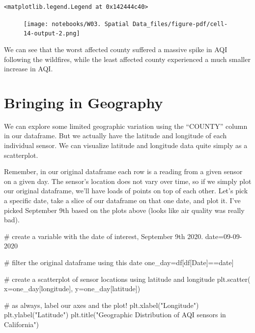 \documentclass[
  letterpaper,
  DIV=11,
  numbers=noendperiod]{scrreprt}
\newenvironment{Shaded}{\begin{snugshade}}{\end{snugshade}}
\newcommand{\CommentTok}[1]{\textcolor[rgb]{0.37,0.37,0.37}{#1}}
\newcommand{\NormalTok}[1]{\textcolor[rgb]{0.00,0.23,0.31}{#1}}
\newcommand{\OperatorTok}[1]{\textcolor[rgb]{0.37,0.37,0.37}{#1}}
\newcommand{\StringTok}[1]{\textcolor[rgb]{0.13,0.47,0.30}{#1}}
\begin{document}
\begin{verbatim}
<matplotlib.legend.Legend at 0x142444c40>
\end{verbatim}

\begin{figure}[H]

{\centering \texttt{[image: notebooks/W03. Spatial Data\_files/figure-pdf/cell-14-output-2.png]}

}

\end{figure}

We can see that the worst affected county suffered a massive spike in
AQI following the wildfires, while the least affected county experienced
a much smaller increase in AQI.

\hypertarget{bringing-in-geography}{%
\section{Bringing in Geography}\label{bringing-in-geography}}

We can explore some limited geographic variation using the ``COUNTY''
column in our dataframe. But we actually have the latitude and longitude
of each individual sensor. We can visualize latitude and longitude data
quite simply as a scatterplot.

Remember, in our original dataframe each row is a reading from a given
sensor on a given day. The sensor's location does not vary over time, so
if we simply plot our original dataframe, we'll have loads of points on
top of each other. Let's pick a specific date, take a slice of our
dataframe on that one date, and plot it. I've picked September 9th based
on the plots above (looks like air quality was really bad).

\begin{Shaded}
\begin{Highlighting}[]
\CommentTok{\# create a variable with the date of interest, September 9th 2020. }
\NormalTok{date}\OperatorTok{=}\StringTok{\textquotesingle{}09{-}09{-}2020\textquotesingle{}}

\CommentTok{\# filter the original dataframe using this date}
\NormalTok{one\_day}\OperatorTok{=}\NormalTok{df[df[}\StringTok{\textquotesingle{}Date\textquotesingle{}}\NormalTok{]}\OperatorTok{==}\NormalTok{date]}

\CommentTok{\# create a scatterplot of sensor locations using latitude and longitude }
\NormalTok{plt.scatter(}
\NormalTok{    x}\OperatorTok{=}\NormalTok{one\_day[}\StringTok{\textquotesingle{}longitude\textquotesingle{}}\NormalTok{],}
\NormalTok{    y}\OperatorTok{=}\NormalTok{one\_day[}\StringTok{\textquotesingle{}latitude\textquotesingle{}}\NormalTok{])}

\CommentTok{\# as always, label our axes and the plot!}
\NormalTok{plt.xlabel(}\StringTok{"Longitude"}\NormalTok{)}
\NormalTok{plt.ylabel(}\StringTok{"Latitude"}\NormalTok{)}
\NormalTok{plt.title(}\StringTok{"Geographic Distribution of AQI sensors in California"}\NormalTok{)}
\end{Highlighting}
\end{Shaded}
\end{document}
